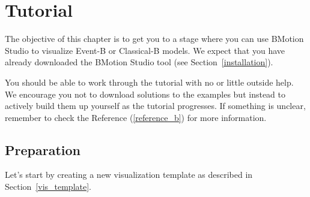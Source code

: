 \section{Tutorial}
\label{tutorial_b}

The objective of this chapter is to get you to a stage where you can use BMotion Studio to visualize Event-B or Classical-B models. 
We expect that you have already downloaded the BMotion Studio tool (see Section~\ref{installation}).
 
You should be able to work through the tutorial with no or little outside help.
We encourage you not to download solutions to the examples but instead to actively build them up yourself as the tutorial progresses.
If something is unclear, remember to check the Reference (\ref{reference_b}) for more information.

\subsection{Preparation}

Let's start by creating a new visualization template as described in Section~\ref{vis_template}.

